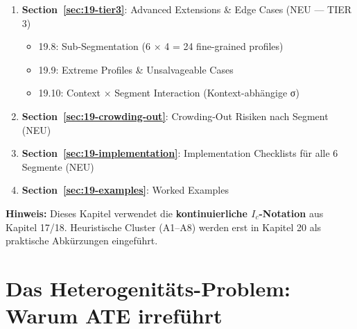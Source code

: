 \begin{tcolorbox}[colback=green!5!white, colframe=green!75!black,
    title=Chapter Overview]
\begin{enumerate}
  \begin{itemize}[nosep]
  \item 19.5: Empirical Calibration of σ-Values (meta-analysis + sensitivity)
  \item 19.6: 9C Integration --- Dimension-Specific Segmentation
  \item 19.7: Screener Validation \& Psychometric Properties
  \end{itemize}
\item \textbf{Section~\ref{sec:19-tier3}}: Advanced Extensions \& Edge Cases (NEU --- TIER 3)
  \begin{itemize}[nosep]
  \item 19.8: Sub-Segmentation (6 × 4 = 24 fine-grained profiles)
  \item 19.9: Extreme Profiles \& Unsalvageable Cases
  \item 19.10: Context × Segment Interaction (Kontext-abhängige σ)
  \end{itemize}
\item \textbf{Section~\ref{sec:19-crowding-out}}: Crowding-Out Risiken nach Segment (NEU)
\item \textbf{Section~\ref{sec:19-implementation}}: Implementation Checklists f\"{u}r alle 6 Segmente (NEU)
\item \textbf{Section~\ref{sec:19-examples}}: Worked Examples
\end{enumerate}

\textbf{Hinweis:} Dieses Kapitel verwendet die \textbf{kontinuierliche $I_c$-Notation} aus Kapitel 17/18. Heuristische Cluster (A1--A8) werden erst in Kapitel 20 als praktische Abk\"{u}rzungen eingef\"{u}hrt.
\end{tcolorbox}


\section{Das Heterogenitäts-Problem: Warum ATE irreführt}
\label{sec:19-heterogeneity}

